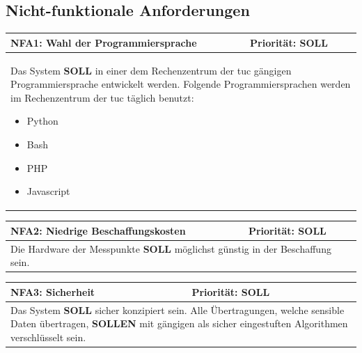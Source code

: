 \documentclass[titlepage]{report}
\begin{document}
\subsection{Nicht-funktionale Anforderungen}
\begin{center}
\begin{tabular}{p{}>{\raggedleft\arraybackslash}p{}}\toprule
    \textbf{NFA1: Wahl der Programmiersprache} & \textbf{Priorität: SOLL} \\\midrule
	\multicolumn{2}{p{\textwidth-\tabcolsep}}{%
        Das System \textbf{SOLL} in einer dem Rechenzentrum der
        \gls{tuc} gängigen Programmiersprache entwickelt werden.
        Folgende Programmiersprachen werden im Rechenzentrum der
        \gls{tuc} täglich benutzt:
        \begin{itemize}
            \item Python
            \item Bash
            \item PHP
            \item Javascript
        \end{itemize}
    }\\\bottomrule
\end{tabular}
    \label{table:NFA1}
\end{center}
\begin{center}
\begin{tabular}{p{}>{\raggedleft\arraybackslash}p{}}\toprule
    \textbf{NFA2: Niedrige Beschaffungskosten} & \textbf{Priorität: SOLL} \\\midrule
	\multicolumn{2}{p{\textwidth-\tabcolsep}}{%
    Die Hardware der Messpunkte \textbf{SOLL} möglichst günstig in der Beschaffung
    sein.
    }\\\bottomrule
\end{tabular}
    \label{table:NFA2}
\end{center}
\begin{center}
\begin{tabular}{p{}>{\raggedleft\arraybackslash}p{}}\toprule
    \textbf{NFA3: Sicherheit} & \textbf{Priorität: SOLL} \\\midrule
	\multicolumn{2}{p{\textwidth-\tabcolsep}}{%
        Das System \textbf{SOLL} sicher konzipiert sein.
        Alle Übertragungen, welche sensible Daten übertragen,  \textbf{SOLLEN} mit gängigen
        als sicher eingestuften Algorithmen verschlüsselt sein.
        }\\\bottomrule
\end{tabular}
    \label{table:NFA3}
\end{center}
\end{document}
